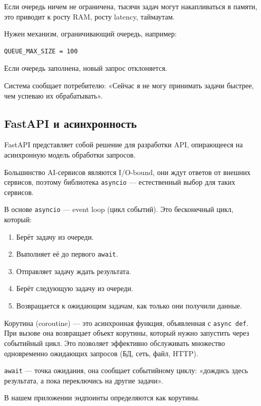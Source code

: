 \documentclass[12pt,a4paper]{article}
\begin{document}
Если очередь ничем не ограничена, тысячи задач могут накапливаться в памяти, это приводит к росту RAM, росту latency, таймаутам.

Нужен механизм, ограничивающий очередь, например:

\begin{lstlisting}[caption={Ограничение очереди}]
QUEUE_MAX_SIZE = 100
\end{lstlisting}

Если очередь заполнена, новый запрос отклоняется.

Система сообщает потребителю: «Сейчас я не могу принимать задачи быстрее, чем успеваю их обрабатывать».

\subsection{FastAPI и асинхронность}

FastAPI представляет собой решение для разработки API, опирающееся на асинхронную модель обработки запросов.

Большинство AI-сервисов являются I/O-bound, они ждут ответов от внешних сервисов, поэтому библиотека \texttt{asyncio} — естественный выбор для таких сервисов.

В основе \texttt{asyncio} — event loop (цикл событий). Это бесконечный цикл, который:

\begin{enumerate}
    \item Берёт задачу из очереди.
    \item Выполняет её до первого \texttt{await}.
    \item Отправляет задачу ждать результата.
    \item Берёт следующую задачу из очереди.
    \item Возвращается к ожидающим задачам, как только они получили данные.
\end{enumerate}

Корутина (coroutine) — это асинхронная функция, объявленная с \texttt{async def}. При вызове она возвращает объект корутины, который нужно запустить через событийный цикл. Это позволяет эффективно обслуживать множество одновременно ожидающих запросов (БД, сеть, файл, HTTP).

\texttt{await} — точка ожидания, она сообщает событийному циклу: «дождись здесь результата, а пока переключись на другие задачи».

В нашем приложении эндпоинты определяются как корутины.
\end{document}
